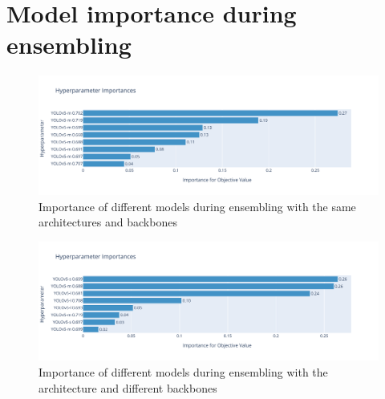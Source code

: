 \section{Model importance during ensembling}


\begin{figure}[H]
    \centering
    \includegraphics[width=\linewidth]{images/ensemble_yolo_importance.pdf}
    \caption{Importance of different models during ensembling with the same architectures and backbones}
    \label{fig:ensembling_hparams_imprtance_yolo_m}
\end{figure}

\begin{figure}[H]
    \centering
    \includegraphics[width=\linewidth]{images/ensemble_yolo_mix_importance.pdf}
    \caption{Importance of different models during ensembling with the architecture and different backbones}
    \label{fig:ensembling_hparams_imprtance_yolo_mix}
\end{figure}

